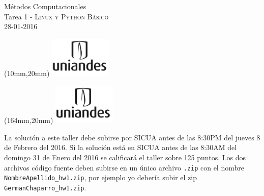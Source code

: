 \documentclass[11pt,letterpaper]{exam}
\begin{document}
\begin{center}
{\Large Métodos Computacionales} \\
Tarea 1 - \textsc{Linux y Python Básico}\\
28-01-2016\\
\end{center}

\begin{textblock*}{40mm}(10mm,20mm)
  \includegraphics[width=3cm]{logoUniandes.png}
\end{textblock*}

\begin{textblock*}{40mm}(164mm,20mm)
  \includegraphics[width=3cm]{logoUniandes.png}
\end{textblock*}

\vspace{0.3cm}

\noindent
La solución a este taller debe subirse por SICUA antes de las 8:30PM
del jueves 8 de Febrero del 2016. 
\noindent
Si la soluci\'on est\'a en SICUA
antes de las 8:30AM del domingo 31 de Enero del 2016 se calificar\'a
el taller sobre 125 puntos. 
\noindent
Los dos archivos c\'odigo fuente deben subirse en un \'unico archivo
\verb".zip" con el nombre \verb"NombreApellido_hw1.zip", por ejemplo
yo deber\'ia subir el zip \verb"GermanChaparro_hw1.zip".

\vspace{0.3cm}
\end{document}
